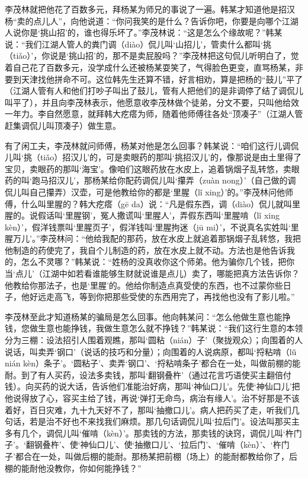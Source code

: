 \documentclass[12pt,UTF8]{ctexbook}
\begin{document}
李茂林就把他花了百数多元，拜杨某为师兄的事说了一遍。韩某才知道他是招汉杨“卖的点儿人”，向他说道：“你问我笑的是什么？告诉你吧，你要是向哪个江湖人说你是‘挑山招’的，谁也得乐坏了。”李茂林说：“这是怎么个缘故呢？”韩某说：“我们江湖人管人的粪门调（diào）侃儿叫‘山招儿’，管卖什么都叫‘挑（tiǎo）’，你说是‘挑山招’的，那不是卖屁股吗？”李茂林把这句侃儿听明白了，觉着自己花了百数多元，没学成什么还被杨某耍笑了，气得脸色更变，直骂杨某，非要到天津找他拼命不可。这位韩先生还算不错，好言相劝，算是把杨的“鼓儿”平了（江湖人管有人和他们打吵子叫出了鼓儿，管有人把他们的是非调停了结了调侃儿叫平了），并且向李茂林表示，他愿意收李茂林做个徒弟，分文不要，只叫他给效一年力。李自然愿意，就拜韩大疙瘩为师，随着他师傅往各处“顶凑子”（江湖人管赶集调侃儿叫顶凑子）做生意。

有了闲工夫，李茂林就问师傅，杨某对他是怎么回事？韩某说：“咱们这行儿调侃儿叫‘挑（tiǎo）招汉儿’的，可是卖眼药的那叫‘挑招汉儿’的，像那说是由土里得了宝贝，卖眼药的那叫‘海宝’。像咱们这眼药放在水皮上，追着锅烟子乱转悠，卖眼药的叫‘跑马招汉儿’，那杨某给你配药调侃儿叫‘攥弄（zuàn nong）’（自己做的调侃儿叫自己攥弄）汉壶，可是他教给你的都是‘里腥（lǐ xing）’的。”李茂林问他师傅，什么叫里腥的？韩大疙瘩（gē da）说：“凡是假东西，调（diào）侃儿就叫里腥的。说假话叫‘里腥钢’，冤人撒谎叫‘里腥人’，弄假东西叫‘里腥啃（lǐ xing kèn）’，假洋钱票叫‘里腥页子’，假洋钱叫‘里腥拘迷（jū mi）’，不说真名实姓叫‘里腥万儿’。”李茂林问：“他给我配的那药，放在水皮上就追着那锅烟子乱转悠，我把他制造的药使完了，我自个儿制造的药，放在水皮上就不动。方法也是他告诉我的，怎么不灵哪？”韩某说：“姓杨的没真收你这个师弟。他为骗你几个钱，把你当‘点儿’（江湖中如若看谁能够生财就说谁是点儿）卖了，哪能把真方法告诉你？他教给你那法子，也是‘里腥’的。他给你制造点真受使的东西，也不过蒙你些日子，他好远走高飞，等到你把那些受使的东西用完了，再找他也没有了影儿啦。”

李茂林至此才知道杨某的骗局是怎么回事。他向韩某问：“怎么他做生意也能挣钱，您做生意也能挣钱，我做生意怎么就不挣钱？”韩某说：“我们这行生意的本领分为三棚：设法招引人围着观瞧，那叫‘圆粘（nián）子’（聚拢观众）；向围着的人说话，叫卖弄‘钢口’（说话的技巧和分量）；向围着的人说病原，都叫‘捋粘啃（lǖ nián kèn）条子’。‘圆粘子’、卖弄‘钢口’、‘捋粘啃条子’都合在一处，叫做前棚的能耐。到了有人买药，设法多卖钱，那叫‘翻钢叠杵’（通过花言巧语使买主翻倍付钱）。向买药的说大话，告诉他们准能治好病，那叫‘神仙口儿’。先使‘神仙口儿’把他说得放了心，容买主给了钱，再说‘弹打无命鸟，病治有缘人’。治不好那是不该着好，百日灾难，九十九天好不了，那叫‘抽撤口儿’。病人把药买了走，听我们几句话，若是治不好也不来找我们麻烦。那几句话调侃儿叫‘拉后门’。设法叫那买主多有几个，调侃儿叫‘催啃（kèn）’。那卖钱的方法，那卖钱的诀窍，调侃儿叫‘杵门子’。‘翻钢叠杵’、使‘神仙口儿’、使‘抽撤口儿’、‘拉后门’、‘催啃（kèn）’、‘杵门子’都合在一处，叫做后棚的能耐。那杨某把前棚（场上）的能耐都教给你了，后棚的能耐他没教你，你如何能挣钱？”
\end{document}

